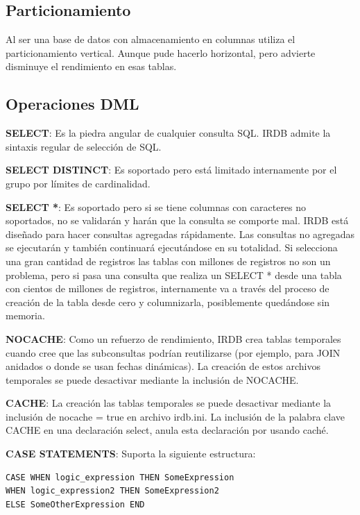 \documentclass{acmart}
\begin{document}
\subsection{Particionamiento}

Al ser una base de datos con almacenamiento en columnas utiliza el particionamiento vertical. Aunque pude hacerlo horizontal, pero advierte disminuye el rendimiento en esas tablas.

\subsection{Operaciones DML}

\textbf{SELECT}: Es la piedra angular de cualquier consulta SQL. IRDB admite la sintaxis regular de selección de SQL.

\textbf{SELECT DISTINCT}: Es soportado pero está limitado internamente por el grupo por límites de cardinalidad.

\textbf{SELECT *}: Es soportado pero si se tiene columnas con caracteres no soportados, no se validarán y harán que la consulta se comporte mal. IRDB está diseñado para hacer consultas agregadas rápidamente. Las consultas no agregadas se ejecutarán y también continuará ejecutándose en su totalidad. Si selecciona una gran cantidad de registros las tablas con millones de registros no son un problema, pero si pasa una consulta que realiza un SELECT * desde una tabla con cientos de millones de registros, internamente va a través del proceso de creación de la tabla desde cero y columnizarla, posiblemente quedándose sin memoria.

\textbf{NOCACHE}: Como un refuerzo de rendimiento, IRDB crea tablas temporales cuando cree que las subconsultas podrían reutilizarse (por ejemplo, para JOIN anidados o donde se usan fechas dinámicas). La creación de estos archivos temporales se puede desactivar mediante la inclusión de NOCACHE.

\textbf{CACHE}: La creación las tablas temporales se puede desactivar mediante la inclusión de nocache = true en
archivo irdb.ini. La inclusión de la palabra clave CACHE en una declaración select, anula esta declaración por
usando caché.

\textbf{CASE STATEMENTS}: Suporta la siguiente estructura:
\begin{verbatim}
CASE WHEN logic_expression THEN SomeExpression
WHEN logic_expression2 THEN SomeExpression2
ELSE SomeOtherExpression END
\end{verbatim}
\end{document}
